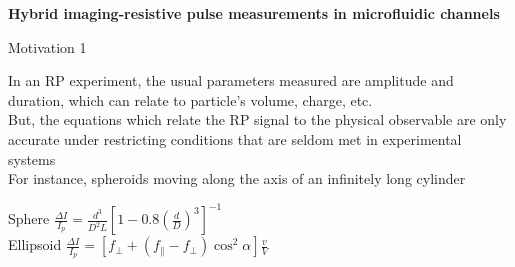 

\begin{frame}[c]{}
	\begin{center}
		\textbf{Hybrid imaging-resistive pulse measurements in microfluidic channels}
	\end{center}
\end{frame}





\begin{frame}[c]{Motivation 1}
	
	In an RP experiment, the usual parameters measured are amplitude and duration, which can relate to particle's volume, charge, etc. \\
	
	But, the equations which relate the RP signal to the physical observable are only accurate under restricting conditions that are seldom met in experimental systems \\
	
	For instance, spheroids moving along the axis of an infinitely long cylinder \\
	
	\vspace{.25in}
	
	{\centering
		Sphere \hspace{.2in} $\frac{\Delta I}{I_{p}}=\frac{d^{3}}{D^{2}L}\left[1-0.8\left(\frac{d}{D}\right)^{3}\right]^{-1}$ \\
		\vspace{.1in}
		Ellipsoid \hspace{.2in} $\frac{\Delta I}{I_{p}}=\left[f_{\perp}+\left(f_{\parallel}-f_{\perp}\right)\cos^{2}\alpha\right]\frac{v}{V}$ \\
	}
	
		 



\end{frame}



